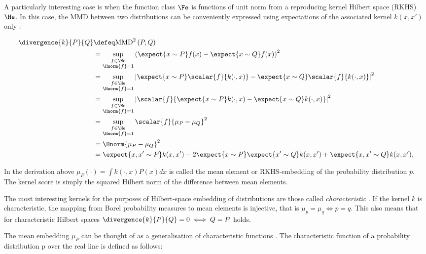 A particularly interesting case is when the function class $\Fe$ is functions of unit norm from a reproducing kernel Hilbert space (RKHS) $\He$. In this case, the MMD between two distributions can be conveniently expressed using expectations of the associated kernel $k(x, x')$ only \citep{Sriperumbudur2010}:

\begin{align}
\divergence{k}{P}{Q} &\defeq \mbox{MMD}^2\left(P,Q\right)\\
	&= \sup_{\substack{f\in\He\\\Hnorm{f}=1}}\left( \expect{x\sim P} f(x) - \expect{x\sim Q} f(x) \right)^2\label{eqn:rkhs-mmd}\\
	&=  \sup_{\substack{f\in\He\\\Hnorm{f}=1}}\left\vert \expect{x\sim P}\scalar{f}{k(\cdot,x)} - \expect{x\sim Q} \scalar{f}{k(\cdot,x)} \right\vert^2\\
	&=  \sup_{\substack{f\in\He\\\Hnorm{f}=1}}\left\vert \scalar{f}{\expect{x\sim P} k(\cdot,x) - \expect{x\sim Q} k(\cdot,x)}\right\vert^2\\
	&=  \sup_{\substack{f\in\He\\\Hnorm{f}=1}}\scalar{f}{\mu_{P} - \mu_{Q}}^2\\
	&=  \Hnorm{\mu_{P} - \mu_{Q}}^2\\
	&=  \expect{x,x'\sim P} k(x,x')	- 2 \expect{x\sim P}\expect{x'\sim Q} k(x,x') + \expect{x,x'\sim Q} k(x,x'),\label{eqn:rkhs-mmd-lastline}
\end{align}

In the derivation above $\mu_P(\cdot) = \int k(\cdot,x) P(x) dx$ is called the mean element or RKHS-embedding of the probability distribution $p$. The kernel score is simply the squared Hilbert norm of the difference between mean elements.

The most interesting kernels for the purposes of Hilbert-space embedding of distributions are those called \emph{characteristic} \citep{Sriperumbudur2008}. If the kernel $k$ is characteristic, the mapping from Borel probability measures to mean elements is injective, that is $\mu_p = \mu_q \iff p = q$. This also means that for characteristic Hilbert spaces $\divergence{k}{P}{Q} = 0 \iff Q=P$ holds.

The mean embedding $\mu_P$ can be thought of as a generalisation of characteristic functions \citep{Ord1999}. The characteristic function of a probability distribution p over the real line is defined as follows:

